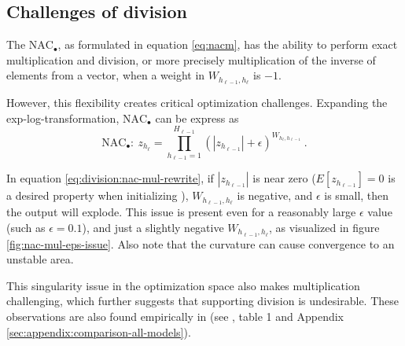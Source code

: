 \subsection{Challenges of division} \label{sssec:nac-mul}

The $\text{NAC}_{\bullet}$, as formulated in equation \ref{eq:nacm}, has the ability to perform exact multiplication and division, or more precisely multiplication of the inverse of elements from a vector, when a weight in $W_{h_{\ell-1},h_\ell}$ is $-1$.

However, this flexibility creates critical optimization challenges. Expanding the exp-log-transformation, $\text{NAC}_{\bullet}$ can be express as
\begin{equation}
\textrm{NAC}_\bullet:\ z_{h_\ell} = \prod_{h_{\ell-1}=1}^{H_{\ell-1}} (|z_{h_{\ell-1}}| + \epsilon)^{W_{h_{\ell}, h_{\ell-1}}}\ .
\label{eq:division:nac-mul-rewrite}
\end{equation}

In equation \eqref{eq:division:nac-mul-rewrite}, if $|z_{h_{\ell-1}}|$ is near zero ($E[z_{h_{\ell-1}}] = 0$ is a desired property when initializing \cite{glorot-initialization}), $W_{h_{\ell-1},h_\ell}$ is negative, and $\epsilon$ is small, then the output will explode. This issue is present even for a reasonably large $\epsilon$ value (such as $\epsilon = 0.1$), and just a slightly negative $W_{h_{\ell-1},h_\ell}$, as visualized in figure \ref{fig:nac-mul-eps-issue}. Also note that the curvature can cause convergence to an unstable area.

This singularity issue in the optimization space also makes multiplication challenging, which further suggests that supporting division is undesirable. These observations are also found empirically in (see \citet{trask-nalu}, table 1 and Appendix \ref{sec:appendix:comparison-all-models}).


